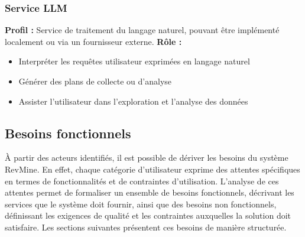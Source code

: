 \subsubsection*{Service LLM}
\textbf{Profil :} Service de traitement du langage naturel, pouvant être implémenté localement ou via un fournisseur externe.
\textbf{Rôle :}
\begin{itemize}
    \item Interpréter les requêtes utilisateur exprimées en langage naturel
    \item Générer des plans de collecte ou d’analyse
    \item Assister l’utilisateur dans l’exploration et l’analyse des données
\end{itemize}

\subsection{Besoins fonctionnels}

À partir des acteurs identifiés, il est possible de dériver les besoins du système RevMine. En effet, chaque catégorie d’utilisateur exprime des attentes spécifiques en termes de fonctionnalités et de contraintes d’utilisation. L’analyse de ces attentes permet de formaliser un ensemble de besoins fonctionnels, décrivant les services que le système doit fournir, ainsi que des besoins non fonctionnels, définissant les exigences de qualité et les contraintes auxquelles la solution doit satisfaire. Les sections suivantes présentent ces besoins de manière structurée.

\renewcommand{\arraystretch}{1.5}

